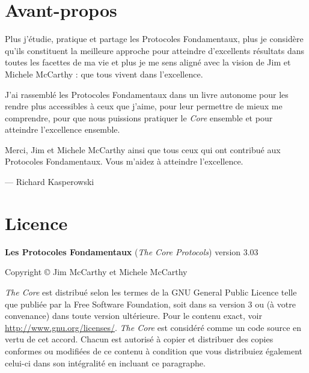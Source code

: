 \documentclass[paper=6in:9in,pagesize=pdftex,headinclude=on,footinclude=on,12pt]{scrbook}
\begin{document}
\setcounter{secnumdepth}{1}
\setcounter{tocdepth}{1}
\tableofcontents

\setlength{\parskip}{0.5em}

\chapter{Avant-propos}

Plus j'étudie, pratique et partage les Protocoles Fondamentaux, plus je considère qu'ils constituent la meilleure approche pour
atteindre d'excellents résultats dans toutes les facettes de ma vie et plus je me sens aligné avec la vision de Jim et Michele McCarthy :
que tous vivent dans l'excellence.

J'ai rassemblé les Protocoles Fondamentaux dans un livre autonome pour les rendre plus accessibles à ceux que j'aime, pour
leur permettre de mieux me comprendre, pour que nous puissions pratiquer le \emph{Core} ensemble et pour atteindre
l'excellence ensemble.

Merci, Jim et Michele McCarthy ainsi que tous ceux qui ont contribué aux Protocoles Fondamentaux. Vous m'aidez à atteindre
l'excellence.

--- Richard Kasperowski


\chapter{Licence}

\begin{samepage}
	\noindent \textbf{Les Protocoles Fondamentaux} (\emph{The Core Protocols}) version 3.03

	\noindent Copyright \copyright{} Jim McCarthy et Michele McCarthy

	\noindent \emph{The Core} est distribué selon les termes de la GNU General Public Licence telle que publiée par la Free Software
	Foundation, soit dans sa version 3 ou (à votre convenance) dans toute version ultérieure. Pour le contenu exact, voir
	\url{http://www.gnu.org/licenses/}. \emph{The Core} est considéré comme un code source en vertu de cet accord. Chacun est autorisé
	à copier et distribuer des copies conformes ou modifiées de ce contenu à condition que vous distribuiez également celui-ci
	dans son intégralité en incluant ce paragraphe.
\end{samepage}
\end{document}
